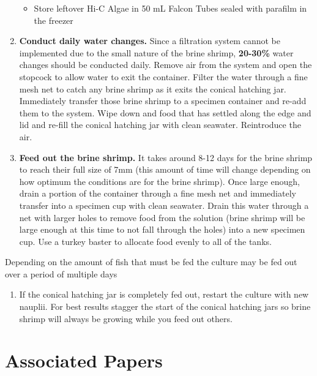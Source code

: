 \documentclass[
  letterpaper,
  DIV=11,
  numbers=noendperiod]{scrreprt}
\providecommand{\tightlist}{%
  \setlength{\itemsep}{0pt}\setlength{\parskip}{0pt}}\usepackage{longtable,booktabs,array}
\begin{document}
\begin{enumerate}
  \begin{itemize}
  \tightlist
  \item
    Store leftover Hi-C Algae in 50 mL Falcon Tubes sealed with parafilm
    in the freezer
  \end{itemize}
\item
  \textbf{Conduct daily water changes.} Since a filtration system cannot
  be implemented due to the small nature of the brine shrimp,
  \textbf{20-30\%} water changes should be conducted daily. Remove air
  from the system and open the stopcock to allow water to exit the
  container. Filter the water through a fine mesh net to catch any brine
  shrimp as it exits the conical hatching jar. Immediately transfer
  those brine shrimp to a specimen container and re-add them to the
  system. Wipe down and food that has settled along the edge and lid and
  re-fill the conical hatching jar with clean seawater. Reintroduce the
  air.
\item
  \textbf{Feed out the brine shrimp.} It takes around 8-12 days for the
  brine shrimp to reach their full size of 7mm (this amount of time will
  change depending on how optimum the conditions are for the brine
  shrimp). Once large enough, drain a portion of the container through a
  fine mesh net and immediately transfer into a specimen cup with clean
  seawater. Drain this water through a net with larger holes to remove
  food from the solution (brine shrimp will be large enough at this time
  to not fall through the holes) into a new specimen cup. Use a turkey
  baster to allocate food evenly to all of the tanks.
\end{enumerate}

Depending on the amount of fish that must be fed the culture may be fed
out over a period of multiple days

\begin{enumerate}
\def\labelenumi{\arabic{enumi}.}
\setcounter{enumi}{6}
\tightlist
\item
  If the conical hatching jar is completely fed out, restart the culture
  with new nauplii. For best results stagger the start of the conical
  hatching jars so brine shrimp will always be growing while you feed
  out others.
\end{enumerate}

\hypertarget{associated-papers-18}{%
\section{Associated Papers}\label{associated-papers-18}}
\end{document}
